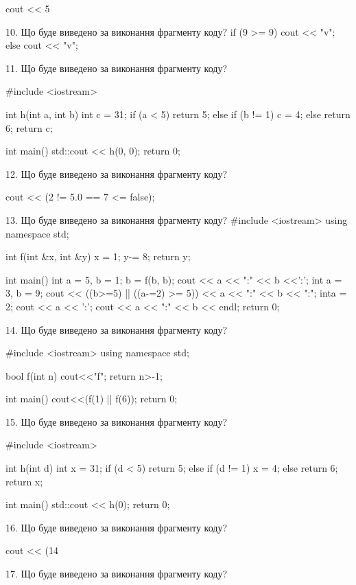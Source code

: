 \documentclass[11pt]{article}
\begin{document}
cout << 5 %

10. Що буде виведено за виконання фрагменту коду?
if (9 >= 9)
    cout << "v";
else
    cout << "v";


11. Що буде виведено за виконання фрагменту коду?

#include <iostream>

int h(int a, int b){
    int c = 31;
    if (a < 5)
        return 5;
    else if (b != 1)
         c = 4;
    else 
        return 6;
    return c;
}

int main(){
    std::cout << h(0, 0);
    return 0;
}

12. Що буде виведено за виконання фрагменту коду?

cout << (2 != 5.0 == 7 <= false);

13. Що буде виведено за виконання фрагменту коду?
#include <iostream>
using namespace std;

int f(int &x, int &y){
    x = 1;
    y-= 8;
    return y;
}

int main(){
    int a = 5, b = 1;
    b = f(b, b);
    cout << a << ":" << b <<':';
    {
        int a = 3, b = 9;
        cout << ((b>=5) || ((a-=2) >= 5))
             << a << ":" << b << ":";
    }
    {
        inta = 2;
        cout << a << ':';
    }
    cout << a << ":" << b << endl;
    return 0;
}


14. Що буде виведено за виконання фрагменту коду?

#include <iostream>
using namespace std;

bool f(int n){
    cout<<"f";
    return n>-1;
}

int main(){
    cout<<(f(1) || f(6));
    return 0;
}

15. Що буде виведено за виконання фрагменту коду?

#include <iostream>

int h(int d){
    int x = 31;
    if (d < 5) 
        return 5;
    else if (d != 1)
         x = 4;
    else
         return 6;
    return x;
}

int main(){
    std::cout << h(0);
    return 0;
}


16. Що буде виведено за виконання фрагменту коду?

cout << (14 %

17. Що буде виведено за виконання фрагменту коду?
\end{document}
